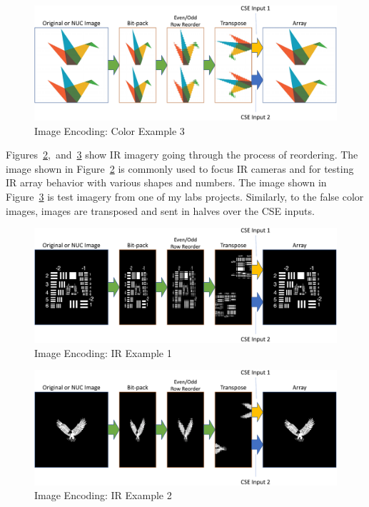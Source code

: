     \begin{figure}
        \centering
        \includegraphics[width=1.0\textwidth]{fig/image_encoding_origami.pdf}
        \caption{Image Encoding: Color Example 3}
        \label{fig:image_encoding_color_example3}
    \end{figure}

    Figures~\ref{fig:image_encoding_ir_example1},~and~\ref{fig:image_encoding_ir_example2} show IR imagery going through the process of reordering. The image shown in Figure~\ref{fig:image_encoding_ir_example1} is commonly used to focus IR cameras and for testing IR array behavior with various shapes and numbers. The image shown in Figure~\ref{fig:image_encoding_ir_example2} is test imagery from one of my labs projects. Similarly, to the false color images, images are transposed and sent in halves over the CSE inputs.

    \begin{figure}
        \centering
        \includegraphics[width=1.0\textwidth]{fig/image_encoding_ir1.pdf}
        \caption{Image Encoding: IR Example 1}
        \label{fig:image_encoding_ir_example1}
    \end{figure}

    \begin{figure}
        \centering
        \includegraphics[width=1.0\textwidth]{fig/image_encoding_ir2.pdf}
        \caption{Image Encoding: IR Example 2}
        \label{fig:image_encoding_ir_example2}
    \end{figure}

